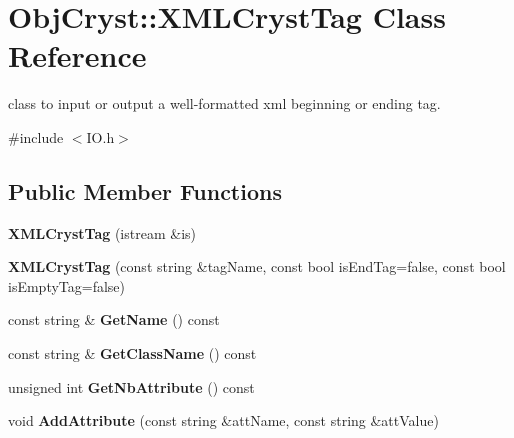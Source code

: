 \hypertarget{class_obj_cryst_1_1_x_m_l_cryst_tag}{}\section{Obj\+Cryst\+::X\+M\+L\+Cryst\+Tag Class Reference}
\label{class_obj_cryst_1_1_x_m_l_cryst_tag}


class to input or output a well-\/formatted xml beginning or ending tag.  




{\ttfamily \#include $<$I\+O.\+h$>$}

\subsection*{Public Member Functions}
\begin{DoxyCompactItemize}
\item 
\mbox{\label{class_obj_cryst_1_1_x_m_l_cryst_tag_a89d1228d4574dd21f2c911ec22996ddc}} 
{\bfseries X\+M\+L\+Cryst\+Tag} (istream \&is)
\item 
\mbox{\label{class_obj_cryst_1_1_x_m_l_cryst_tag_a2ffd153fc95c129002a3dd9827769a13}} 
{\bfseries X\+M\+L\+Cryst\+Tag} (const string \&tag\+Name, const bool is\+End\+Tag=false, const bool is\+Empty\+Tag=false)
\item 
\mbox{\label{class_obj_cryst_1_1_x_m_l_cryst_tag_adae02029d6ede367bcd845af5840c4cd}} 
const string \& {\bfseries Get\+Name} () const
\item 
\mbox{\label{class_obj_cryst_1_1_x_m_l_cryst_tag_aa851ef0395a7c162efd03dc09d2ae944}} 
const string \& {\bfseries Get\+Class\+Name} () const
\item 
\mbox{\label{class_obj_cryst_1_1_x_m_l_cryst_tag_a515530e471d3ef653a4df0f19b1023c9}} 
unsigned int {\bfseries Get\+Nb\+Attribute} () const
\item 
\mbox{\label{class_obj_cryst_1_1_x_m_l_cryst_tag_a20fc20c3a1c1378811a6f2afb5c9acab}} 
void {\bfseries Add\+Attribute} (const string \&att\+Name, const string \&att\+Value)

\end{DoxyCompactItemize}
